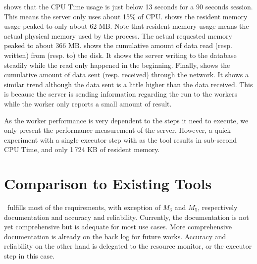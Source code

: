  shows that the CPU Time usage is just below 13 seconds for a 90 seconds session.
This means the server only uses about 15\% of CPU.
 shows the resident memory usage peaked to only about 62 MB.
Note that resident memory usage means the actual physical memory used by the process.
The actual requested memory peaked to about 366 MB.
 shows the cumulative amount of data read (resp. written) from (resp. to) the disk.
It shows the server writing to the database steadily while the read only happened in the beginning.
Finally,  shows the cumulative amount of data sent (resp. received) through the network.
It shows a similar trend although the data sent is a little higher than the data received.
This is because the server is sending information regarding the run to the workers while the worker only reports a small amount of result.

As the worker performance is very dependent to the steps it need to execute, we only present the performance measurement of the server.
However, a quick experiment with a single executor step with  as the tool results in sub-second CPU Time, and only 1\,724 KB of resident memory.

\section{Comparison to Existing Tools}
\label{sec:eval.comparison}


\OurBenchmarkingTool~fulfills most of the requirements, with exception of $M_3$ and $M_5$, respectively documentation and accuracy and reliability.
Currently, the documentation is not yet comprehensive but is adequate for most use cases.
More comprehensive documentation is already on the back log for future works.
Accuracy and reliability on the other hand is delegated to the resource monitor, or the executor step in this case.

